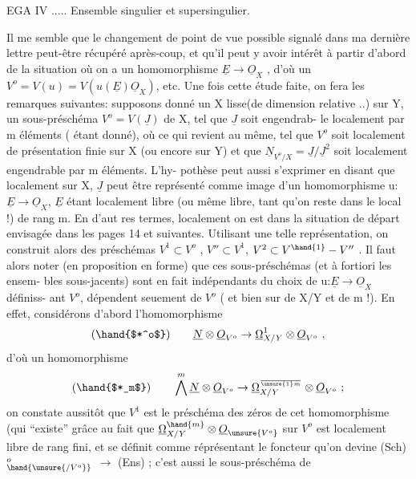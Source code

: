 
EGA IV ..... Ensemble singulier et supersingulier.

Il me semble que le changement de point de vue possible signalé dans ma
dernière lettre peut-être récupéré après-coup, et qu'il peut y avoir intérêt
à partir d'abord de la situation où on a  un homomorphisme $\underline{E}\to\underline{O}_X$ , d'où
un $V^o = V(u) = V(u(\underline{E})\underline{O}_X)$, etc. Une fois cette étude faite, on fera les
remarques suivantes: supposons donné un X lisse(de dimension relative  ..)
sur Y, un sous-préschéma $V^o = V(\underline{J})$ de X, tel que $\underline{J}$  soit engendrab-%
le localement  par m éléments ( étant donné), où ce qui revient au
même, tel que $V^o$ soit localement de présentation finie sur X (ou encore sur
Y) et que  $\underline{N}_{V^o/X} = \underline{J}/\underline{J}^2$  soit localement engendrable par m éléments.  L'hy-%
pothèse peut aussi s'exprimer en disant que localement sur X, $\underline{J}$ peut être
représenté comme image d'un homomorphisme  u: $\underline{E}\to\underline{O}_X$, $\underline{E}$ étant localement
libre (ou même libre, tant qu'on reste dans le local !) de rang m.  En d'aut
res termes, localement on est dans la situation de départ envisagée dans
les pages 14 et suivantes. Utilisant une telle représentation, on construit
alors des préschémas  $V^1 \subset V^o$ , $V'' \subset V^1$, $V^2 \subset V^{\hand{1}}-V''$ . Il faut alors noter
(en proposition en forme) que ces sous-préschémas (et à fortiori les ensem-%
bles sous-jacents) sont en fait indépendants du choix de u:$\underline{E}\to\underline{O}_X$ définiss-%
ant $V^o$,   dépendent seuement de  $V^o$ ( et bien sur de X/Y et de
m !).  En effet, considérons d'abord  l'homomorphisme
\[ (\hand{$*^o$}) \qquad \underline{N}\otimes\underline{O}_{V^o}\to\underline{\Omega}^1_{X/Y}\otimes\underline{O}_{V^o} \ , \]
d'où  un homomorphisme
\[ (\hand{$*_m$}) \qquad \bigwedge^m\underline{N}\otimes\underline{O}_{V^o}\to\underline{\Omega}^{\over{\unsure{1}}{m}}_{X/Y}\otimes\underline{O}_{V^o}\ ; \]
on constate aussitôt que $V^1$ est le préschéma des zéros de cet homomorphisme
(qui ``existe'' grâce au fait que $\underline{\Omega}^{\hand{m}}_{X/Y}\otimes\underline{O}_{\unsure{V^o}}$  sur  $V^o$ est localement libre
de rang fini, et se définit comme réprésentant le foncteur qu'on devine
(Sch)$^o_{\hand{\unsure{/V^o}}}$ $\longrightarrow$ (Ens) ; c'est aussi le sous-préschéma de 

